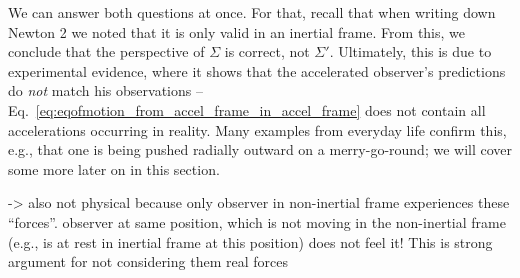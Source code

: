 \documentclass[../class_mech_main.tex]{subfiles}
\begin{document}
We can answer both questions at once. For that, recall that when writing down Newton 2 we noted that it is only valid in an inertial frame. From this, we conclude that the perspective of $\Sigma$ is correct, not $\Sigma'$. Ultimately, this is due to experimental evidence, where it shows that the accelerated observer's predictions do \emph{not} match his observations -- Eq.~\eqref{eq:eqofmotion_from_accel_frame_in_accel_frame} does not contain all accelerations occurring in reality. Many examples from everyday life confirm this, e.g., that one is being pushed radially outward on a merry-go-round; we will cover some more later on in this section.

-> also not physical because only observer in non-inertial frame experiences these \enquote{forces}. observer at same position, which is not moving in the non-inertial frame (e.g., is at rest in inertial frame at this position) does not feel it! This is strong argument for not considering them real forces
\end{document}
